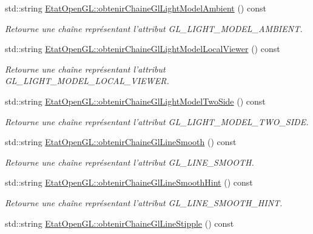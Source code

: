 \begin{DoxyCompactItemize}
std\-::string \hyperlink{group__utilitaire_gafee564b101971fe6c901050b13522dc7}{Etat\-Open\-G\-L\-::obtenir\-Chaine\-Gl\-Light\-Model\-Ambient} () const 
\begin{DoxyCompactList}\small\item\em Retourne une chaîne représentant l'attribut G\-L\-\_\-\-L\-I\-G\-H\-T\-\_\-\-M\-O\-D\-E\-L\-\_\-\-A\-M\-B\-I\-E\-N\-T. \end{DoxyCompactList}\item 
std\-::string \hyperlink{group__utilitaire_gad3dbc66405e9f773549840afceebda51}{Etat\-Open\-G\-L\-::obtenir\-Chaine\-Gl\-Light\-Model\-Local\-Viewer} () const 
\begin{DoxyCompactList}\small\item\em Retourne une chaîne représentant l'attribut G\-L\-\_\-\-L\-I\-G\-H\-T\-\_\-\-M\-O\-D\-E\-L\-\_\-\-L\-O\-C\-A\-L\-\_\-\-V\-I\-E\-W\-E\-R. \end{DoxyCompactList}\item 
std\-::string \hyperlink{group__utilitaire_gab355049dd400e05dcf9057355f954b2d}{Etat\-Open\-G\-L\-::obtenir\-Chaine\-Gl\-Light\-Model\-Two\-Side} () const 
\begin{DoxyCompactList}\small\item\em Retourne une chaîne représentant l'attribut G\-L\-\_\-\-L\-I\-G\-H\-T\-\_\-\-M\-O\-D\-E\-L\-\_\-\-T\-W\-O\-\_\-\-S\-I\-D\-E. \end{DoxyCompactList}\item 
std\-::string \hyperlink{group__utilitaire_ga3823c538863f06203e0f72df0af8e517}{Etat\-Open\-G\-L\-::obtenir\-Chaine\-Gl\-Line\-Smooth} () const 
\begin{DoxyCompactList}\small\item\em Retourne une chaîne représentant l'attribut G\-L\-\_\-\-L\-I\-N\-E\-\_\-\-S\-M\-O\-O\-T\-H. \end{DoxyCompactList}\item 
std\-::string \hyperlink{group__utilitaire_ga259303d6900794169347807035689bc8}{Etat\-Open\-G\-L\-::obtenir\-Chaine\-Gl\-Line\-Smooth\-Hint} () const 
\begin{DoxyCompactList}\small\item\em Retourne une chaîne représentant l'attribut G\-L\-\_\-\-L\-I\-N\-E\-\_\-\-S\-M\-O\-O\-T\-H\-\_\-\-H\-I\-N\-T. \end{DoxyCompactList}\item 
std\-::string \hyperlink{group__utilitaire_gae6a2fafc56ddcffeb516c7e7451ee620}{Etat\-Open\-G\-L\-::obtenir\-Chaine\-Gl\-Line\-Stipple} () const 

\end{DoxyCompactItemize}
